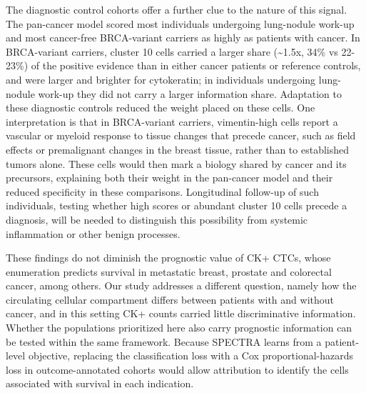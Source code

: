 \documentclass[11pt]{article}
\begin{document}
The diagnostic control cohorts offer a further clue to the nature of this signal. The pan-cancer model scored most individuals undergoing lung-nodule work-up and most cancer-free BRCA-variant carriers as highly as patients with cancer. In BRCA-variant carriers, cluster 10 cells carried a larger share (\textasciitilde 1.5x, 34\% vs 22-23\%) of the positive evidence than in either cancer patients or reference controls, and were larger and brighter for cytokeratin; in individuals undergoing lung-nodule work-up they did not carry a larger information share. Adaptation to these diagnostic controls reduced the weight placed on these cells. One interpretation is that in BRCA-variant carriers, vimentin-high cells report a vascular or myeloid response to tissue changes that precede cancer, such as field effects\cite{slaughter1953,steiling2008} or premalignant changes in the breast tissue\cite{lim2009}, rather than to established tumors alone. These cells would then mark a biology shared by cancer and its precursors, explaining both their weight in the pan-cancer model and their reduced specificity in these comparisons. Longitudinal follow-up of such individuals, testing whether high scores or abundant cluster 10 cells precede a diagnosis, will be needed to distinguish this possibility from systemic inflammation or other benign processes.

These findings do not diminish the prognostic value of CK+ CTCs, whose enumeration predicts survival in metastatic breast, prostate and colorectal cancer, among others\cite{cristofanilli2004,debono2008,cohen2008}. Our study addresses a different question, namely how the circulating cellular compartment differs between patients with and without cancer, and in this setting CK+ counts carried little discriminative information. Whether the populations prioritized here also carry prognostic information can be tested within the same framework. Because SPECTRA learns from a patient-level objective, replacing the classification loss with a Cox proportional-hazards loss\cite{katzman2018} in outcome-annotated cohorts would allow attribution to identify the cells associated with survival in each indication.
\end{document}
